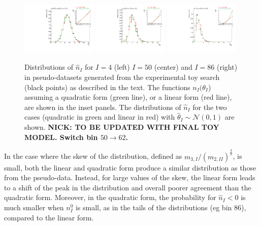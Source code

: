 \documentclass[11pt]{article}
\begin{document}
\begin{figure}%
\centering
\includegraphics[width=0.32\textwidth]{figures/distribution_4}
\includegraphics[width=0.32\textwidth]{figures/distribution_50}
\includegraphics[width=0.32\textwidth]{figures/distribution_86}
\caption{Distributions of $\hat{n}_{I}$ for $I=4$ (left) $I=50$ (center) and $I=86$ (right) in pseudo-datasets generated from the experimental toy search (black points) as described in the text.
  The functions $n_{I}(\theta_{I}$) assuming a quadratic form (green line), or a linear form (red line), are shown in the inset panels.
  The distributions of $\hat{n}_{I}$ for the two cases (quadratic in green and linear in red) with $\hat{\theta}_{I}\sim\mathcal{N}(0,1)$ are shown.
  \textbf{\color{red} NICK: TO BE UPDATED WITH FINAL TOY MODEL. Switch bin $50 \to 62$.}
}
\label{fig:distributions}
\end{figure}

In the case where the skew of the distribution, defined as $m_{3,I}/(m_{2,II})^{\frac{3}{2}}$, is small,
both the linear and quadratic form produce a similar distribution as those from the pseudo-data.
Instead, for large values of the skew, the linear form leads to a shift of the peak in the distribution and overall poorer
agreement than the quadratic form. Moreover, in the quadratic form, the probability for $\hat{n}_{I}<0$
is much smaller when $n^{0}_{I}$ is small, as in the tails of the distributions (eg bin $86$), compared to the linear form.
\end{document}
